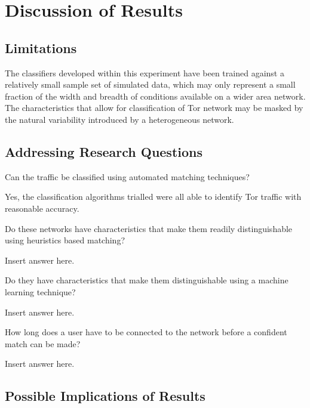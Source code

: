 \chapter{Discussion of Results}

\section{Limitations}

The classifiers developed within this experiment have been trained against
a relatively small sample set of simulated data, which may only represent
a small fraction of the width and breadth of conditions available on a wider
area network. The characteristics that allow for classification of Tor network
may be masked by the natural variability introduced by a heterogeneous network.

\section{Addressing Research Questions}

\begin{enumerate*}
  \item{Can the traffic be classified using automated matching techniques?}

  Yes, the classification algorithms trialled were all able to identify Tor traffic
  with reasonable accuracy.

  \item{Do these networks have characteristics that make them readily
  distinguishable using heuristics based matching?}

  Insert answer here.

  \item{Do they have characteristics that make them distinguishable using a
  machine learning technique?}

  Insert answer here.

  \item{How long does a user have to be connected to the network before a
  confident match can be made?}

  Insert answer here.

\end{enumerate*}


\section{Possible Implications of Results}

